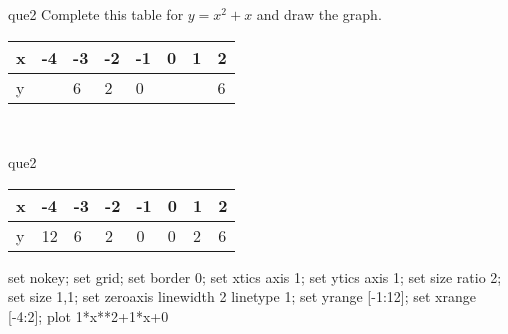 \documentclass[13.5pt, varwidth=true]{beamer}
\begin{document}
\begin{frame}[shrink=19,fragile]
	\begin{beamercolorbox}[rounded=true, left, shadow=true,wd=14.8cm]{que2}
		 Complete this table for $y = x^{2} + x$ and draw the graph. \\[0.3cm] \renewcommand{\arraystretch}{1.2}\begin{tabular}{|C|C|C|C|C|C|C|C|} \hline x & -4 & -3 & -2 & -1 & 0 & 1 & 2 \\ \hline y &  & 6 & 2 & 0 &  &  & 6\\ \hline \end{tabular}\\[0.3cm]
	\end{beamercolorbox}
\end{frame}
\begin{frame}[shrink=19,fragile]
	\begin{beamercolorbox}[rounded=true, left, shadow=true,wd=14.8cm]{que2}
		\renewcommand{\arraystretch}{1.2}\begin{tabular}{|C|C|C|C|C|C|C|C|} \hline x & -4 & -3 & -2 & -1 & 0 & 1 & 2 \\ \hline y & 12 & 6 & 2 & 0 & 0 & 2 & 6\\ \hline \end{tabular}\begin{gnuplot}[terminal=pdf] set nokey; set grid; set border 0; set xtics axis 1; set ytics axis 1; set size ratio 2; set size 1,1; set zeroaxis linewidth 2 linetype 1; set yrange [-1:12]; set xrange [-4:2]; plot 1*x**2+1*x+0 \end{gnuplot}
	\end{beamercolorbox}
\end{frame}
\end{document}
